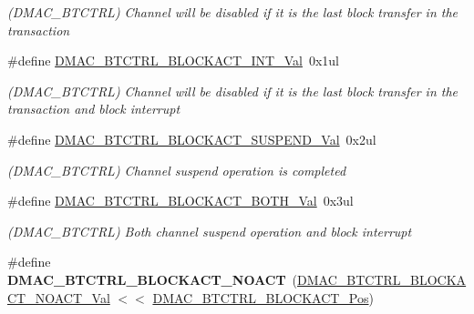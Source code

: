 \begin{DoxyCompactItemize}
\begin{DoxyCompactList}\small\item\em (D\+M\+A\+C\+\_\+\+B\+T\+C\+T\+R\+L) Channel will be disabled if it is the last block transfer in the transaction \end{DoxyCompactList}\item 
\hypertarget{group___s_a_m_l21___d_m_a_c_ga8605dcd06a16a3950e7181cd5a231bfc}{}\#define \hyperlink{group___s_a_m_l21___d_m_a_c_ga8605dcd06a16a3950e7181cd5a231bfc}{D\+M\+A\+C\+\_\+\+B\+T\+C\+T\+R\+L\+\_\+\+B\+L\+O\+C\+K\+A\+C\+T\+\_\+\+I\+N\+T\+\_\+\+Val}~0x1ul\label{group___s_a_m_l21___d_m_a_c_ga8605dcd06a16a3950e7181cd5a231bfc}

\begin{DoxyCompactList}\small\item\em (D\+M\+A\+C\+\_\+\+B\+T\+C\+T\+R\+L) Channel will be disabled if it is the last block transfer in the transaction and block interrupt \end{DoxyCompactList}\item 
\hypertarget{group___s_a_m_l21___d_m_a_c_ga6a02db6a41d6c6df8b95fae49b817100}{}\#define \hyperlink{group___s_a_m_l21___d_m_a_c_ga6a02db6a41d6c6df8b95fae49b817100}{D\+M\+A\+C\+\_\+\+B\+T\+C\+T\+R\+L\+\_\+\+B\+L\+O\+C\+K\+A\+C\+T\+\_\+\+S\+U\+S\+P\+E\+N\+D\+\_\+\+Val}~0x2ul\label{group___s_a_m_l21___d_m_a_c_ga6a02db6a41d6c6df8b95fae49b817100}

\begin{DoxyCompactList}\small\item\em (D\+M\+A\+C\+\_\+\+B\+T\+C\+T\+R\+L) Channel suspend operation is completed \end{DoxyCompactList}\item 
\hypertarget{group___s_a_m_l21___d_m_a_c_gaff1916c577aec155dc2978b341daace2}{}\#define \hyperlink{group___s_a_m_l21___d_m_a_c_gaff1916c577aec155dc2978b341daace2}{D\+M\+A\+C\+\_\+\+B\+T\+C\+T\+R\+L\+\_\+\+B\+L\+O\+C\+K\+A\+C\+T\+\_\+\+B\+O\+T\+H\+\_\+\+Val}~0x3ul\label{group___s_a_m_l21___d_m_a_c_gaff1916c577aec155dc2978b341daace2}

\begin{DoxyCompactList}\small\item\em (D\+M\+A\+C\+\_\+\+B\+T\+C\+T\+R\+L) Both channel suspend operation and block interrupt \end{DoxyCompactList}\item 
\hypertarget{group___s_a_m_l21___d_m_a_c_ga95d86bc048e58482a8196a1b0c2785c6}{}\#define {\bfseries D\+M\+A\+C\+\_\+\+B\+T\+C\+T\+R\+L\+\_\+\+B\+L\+O\+C\+K\+A\+C\+T\+\_\+\+N\+O\+A\+C\+T}~(\hyperlink{group___s_a_m_l21___d_m_a_c_gae3898b14fd517579b8b018b2ba176c4d}{D\+M\+A\+C\+\_\+\+B\+T\+C\+T\+R\+L\+\_\+\+B\+L\+O\+C\+K\+A\+C\+T\+\_\+\+N\+O\+A\+C\+T\+\_\+\+Val} $<$$<$ \hyperlink{group___s_a_m_l21___d_m_a_c_ga65ebce978928207ff9f7ae48e8a1c602}{D\+M\+A\+C\+\_\+\+B\+T\+C\+T\+R\+L\+\_\+\+B\+L\+O\+C\+K\+A\+C\+T\+\_\+\+Pos})\label{group___s_a_m_l21___d_m_a_c_ga95d86bc048e58482a8196a1b0c2785c6}


\end{DoxyCompactItemize}
